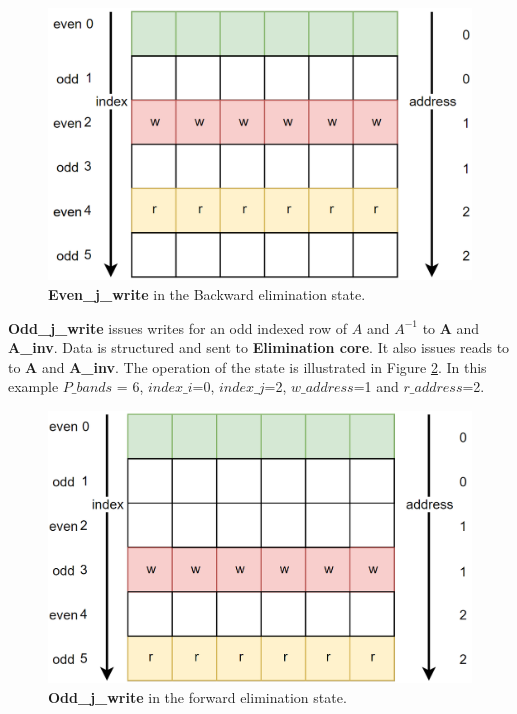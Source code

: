 \begin{figure}[H]
\centering
   \includegraphics[scale=0.5]{images/inverse_fsms/forward_elim/write_even.PNG}
  \caption{\textbf{Even\_j\_write} in the Backward elimination state. } 
  \label{fig:forward_elim_even_indexed_j}
\end{figure}

\textbf{Odd\_j\_write} issues writes for an odd indexed row of $A$ and $A^{-1}$ to \textbf{A} and \textbf{A\_inv}. Data is structured and sent to \textbf{Elimination core}. It also issues reads to to \textbf{A} and \textbf{A\_inv}. The operation of the state is illustrated in Figure \ref{fig:forward_elim_odd_indexed_j}. In this example $P\_bands$ = 6, $index\_i$=0, $index\_j$=2, $w\_address$=1 and $r\_address$=2. 

\begin{figure}[H]
\centering
   \includegraphics[scale=0.3]{images/inverse_fsms/forward_elim/write_odd.PNG}
  \caption{\textbf{Odd\_j\_write} in the forward elimination state. } 
  \label{fig:forward_elim_odd_indexed_j}
\end{figure}







